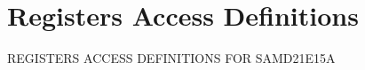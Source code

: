 \hypertarget{group___s_a_m_d21_e15_a__reg}{}\section{Registers Access Definitions}
\label{group___s_a_m_d21_e15_a__reg}
R\+E\+G\+I\+S\+T\+E\+RS A\+C\+C\+E\+SS D\+E\+F\+I\+N\+I\+T\+I\+O\+NS F\+OR S\+A\+M\+D21\+E15A 